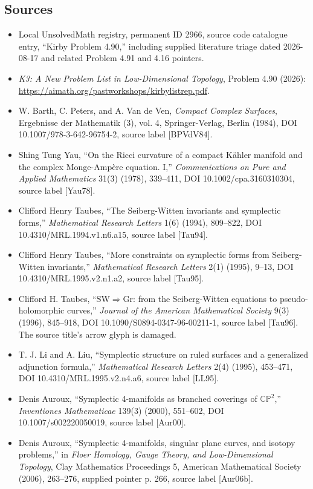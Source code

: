 \documentclass[11pt]{article}
\begin{document}
\subsection{Sources}
\begin{itemize}
\item Local UnsolvedMath registry, permanent ID 2966, source code catalogue entry, ``Kirby Problem 4.90,'' including supplied literature triage dated 2026-08-17 and related Problem 4.91 and 4.16 pointers.
\item \emph{K3: A New Problem List in Low-Dimensional Topology}, Problem 4.90 (2026): \url{https://aimath.org/pastworkshops/kirbylistrep.pdf}.
\item W. Barth, C. Peters, and A. Van de Ven, \emph{Compact Complex Surfaces}, Ergebnisse der Mathematik (3), vol. 4, Springer-Verlag, Berlin (1984), DOI 10.1007/978-3-642-96754-2, source label [BPVdV84].
\item Shing Tung Yau, ``On the Ricci curvature of a compact K\"ahler manifold and the complex Monge-Amp\`ere equation. I,'' \emph{Communications on Pure and Applied Mathematics} 31(3) (1978), 339--411, DOI 10.1002/cpa.3160310304, source label [Yau78].
\item Clifford Henry Taubes, ``The Seiberg-Witten invariants and symplectic forms,'' \emph{Mathematical Research Letters} 1(6) (1994), 809--822, DOI 10.4310/MRL.1994.v1.n6.a15, source label [Tau94].
\item Clifford Henry Taubes, ``More constraints on symplectic forms from Seiberg-Witten invariants,'' \emph{Mathematical Research Letters} 2(1) (1995), 9--13, DOI 10.4310/MRL.1995.v2.n1.a2, source label [Tau95].
\item Clifford H. Taubes, ``\(\mathrm{SW}\Rightarrow\mathrm{Gr}\): from the Seiberg-Witten equations to pseudo-holomorphic curves,'' \emph{Journal of the American Mathematical Society} 9(3) (1996), 845--918, DOI 10.1090/S0894-0347-96-00211-1, source label [Tau96]. The source title's arrow glyph is damaged.
\item T. J. Li and A. Liu, ``Symplectic structure on ruled surfaces and a generalized adjunction formula,'' \emph{Mathematical Research Letters} 2(4) (1995), 453--471, DOI 10.4310/MRL.1995.v2.n4.a6, source label [LL95].
\item Denis Auroux, ``Symplectic 4-manifolds as branched coverings of \(\mathbb{CP}^2\),'' \emph{Inventiones Mathematicae} 139(3) (2000), 551--602, DOI 10.1007/s002220050019, source label [Aur00].
\item Denis Auroux, ``Symplectic 4-manifolds, singular plane curves, and isotopy problems,'' in \emph{Floer Homology, Gauge Theory, and Low-Dimensional Topology}, Clay Mathematics Proceedings 5, American Mathematical Society (2006), 263--276, supplied pointer p. 266, source label [Aur06b].

\end{itemize}
\end{document}
